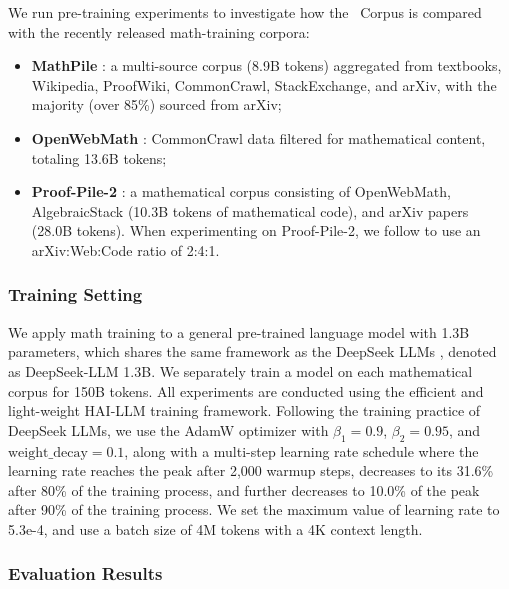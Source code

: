 We run pre-training experiments to investigate how the \spmath~Corpus is compared with the recently released math-training corpora:
\begin{itemize}[topsep=0pt]
    \item \textbf{MathPile} \citep{mathpile}: a multi-source corpus (8.9B tokens) aggregated from textbooks, Wikipedia, ProofWiki, CommonCrawl, StackExchange, and arXiv, with the majority (over 85\%) sourced from arXiv;
    \item \textbf{OpenWebMath} \citep{openwebmath}: CommonCrawl data filtered for mathematical content, totaling 13.6B tokens;
    \item \textbf{Proof-Pile-2} \citep{llemma}: a mathematical corpus consisting of OpenWebMath, AlgebraicStack (10.3B tokens of mathematical code), and arXiv papers (28.0B tokens).
    When experimenting on Proof-Pile-2, we follow \cite{llemma} to use an arXiv:Web:Code ratio of 2:4:1.
\end{itemize}

\subsubsection{Training Setting}
\label{sec:quality-policy}
We apply math training to a general pre-trained language model with 1.3B parameters, which shares the same framework as the DeepSeek LLMs \citep{deepseek-llm}, denoted as DeepSeek-LLM 1.3B.
We separately train a model on each mathematical corpus for 150B tokens. All experiments are conducted using the efficient and light-weight HAI-LLM \citep{haillm} training framework.
Following the training practice of DeepSeek LLMs, we use the AdamW optimizer \citep{adamW} with $\beta_1=0.9$, $\beta_2=0.95$, and $\mathrm{weight\_decay}=0.1$, along with a multi-step learning rate schedule where the learning rate reaches the peak after 2,000 warmup steps, decreases to its 31.6\% after 80\% of the training process, and further decreases to 10.0\% of the peak after 90\% of the training process.
We set the maximum value of learning rate to 5.3e-4, and use a batch size of 4M tokens with a 4K context length.


\begingroup
\setlength{\tabcolsep}{3pt} 
\renewcommand{\arraystretch}{1} 

\endgroup


\subsubsection{Evaluation Results}

